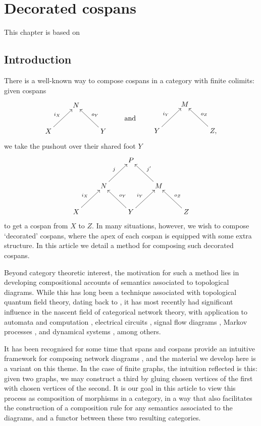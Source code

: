 \chapter{Decorated cospans}

This chapter is based on \cite{fong_decorated_2015}


\section{Introduction}

There is a well-known way to compose cospans in a category with finite colimits:
given cospans
\[
  \begin{aligned}
    \xymatrix{
      & N \\
      X \ar[ur]^{i_X} && Y \ar[ul]_{o_Y}
    }
  \end{aligned}
  \qquad \vcenter{\xymatrix{\mbox{and}}} \qquad
  \begin{aligned}
    \xymatrix{
      & M \\
      Y \ar[ur]^{i_Y} && Z, \ar[ul]_{o_Z}
    }
  \end{aligned}
\]
we take the pushout over their shared foot $Y$ 
\[
  \xymatrix{
    && P \\
    & N \ar[ur]^j && M \ar[ul]_{j'} \\
    X \ar[ur]^{i_X} && Y \ar[ul]_{o_Y} \ar[ur]^{i_Y} && Z \ar[ul]_{o_Z}
  }
\]
to get a cospan from $X$ to $Z$. In many situations, however, we wish to compose
`decorated' cospans, where the apex of each cospan is equipped with some extra
structure. In this article we detail a method for composing such decorated
cospans. 

Beyond category theoretic interest, the motivation for such a method lies in
developing compositional accounts of semantics associated to topological
diagrams. While this has long been a technique associated with topological
quantum field theory, dating back to \cite{At}, it has most recently had
significant influence in the nascent field of categorical network theory, with
application to automata and computation \cite{KSW2, Sp}, electrical circuits
\cite{BF}, signal flow diagrams \cite{BSZ, BE}, Markov processes \cite{BP,
ASW}, and dynamical systems \cite{VSL}, among others. 

It has been recognised for some time that spans and cospans provide an intuitive
framework for composing network diagrams \cite{KSW}, and the material we develop
here is a variant on this theme. In the case of finite graphs, the intuition
reflected is this: given two graphs, we may construct a third by gluing chosen
vertices of the first with chosen vertices of the second. It is our goal in this
article to view this process as composition of morphisms in a category, in a way
that also facilitates the construction of a composition rule for any semantics
associated to the diagrams, and a functor between these two resulting
categories.

